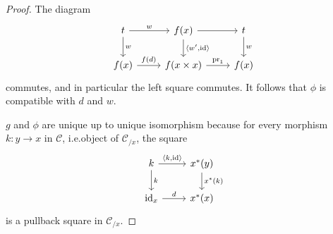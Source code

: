 \documentclass[a4paper]{article}
\theoremstyle{remark}
\theoremstyle{definition}
\begin{document}
\begin{proof}
  The diagram
  \begin{equation}
    \begin{tikzcd}
      t \arrow[r, "w"] \arrow[d, "w"] & f(x) \arrow[d, "{\langle w', \mathrm{id}\rangle}"] \arrow[r] & t \arrow[d, "w"] \\
      f(x) \arrow[r, "f(d)"] & f(x \times x) \arrow[r, "\mathrm{pr}_1"] & f(x)
    \end{tikzcd}
  \end{equation}
  commutes, and in particular the left square commutes.
  It follows that $\phi$ is compatible with $d$ and $w$.

  $g$ and $\phi$ are unique up to unique isomorphism because for every morphism $k : y \rightarrow x$ in $\mathcal{C}$, i.e.\@ object of $\mathcal{C}_{/ x}$, the square
  \begin{equation}
    \begin{tikzcd}
      k \arrow[r, "{\langle k, \mathrm{id} \rangle}"] \arrow[d, "k"] & x^*(y) \arrow[d, "x^*(k)"] \\
      \mathrm{id}_x \arrow[r, "d"] & x^*(x)
    \end{tikzcd}
  \end{equation}
  is a pullback square in $\mathcal{C}_{/ x}$.
\end{proof}
\end{document}
